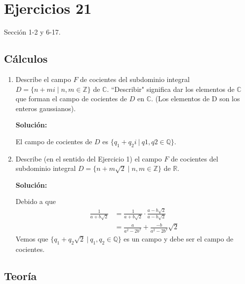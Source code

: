 \section*{Ejercicios 21}
Sección  1-2 y 6-17. 

\subsection*{Cálculos}
\begin{enumerate}
	\item Describe el campo $F$ de cocientes del subdominio integral $D = \{n + mi \mid n, m \in \mathbb{Z}\}$ de $\mathbb{C}$. ``Describir" significa dar los elementos de $\mathbb{C}$ que forman el campo de cocientes de $D$ en $\mathbb{C}$. (Los elementos de D son los enteros gaussianos).
	
	\textbf{Solución:}
	
	El campo de cocientes de $D$ es $\{q_{1} + q_{2}i \ | \ q1, q2 \in \mathbb{Q}\}$.
	
	\item Describe (en el sentido del Ejercicio 1) el campo $F$ de cocientes del subdominio integral $D = \{n + m\sqrt{2} \mid n, m \in \mathbb{Z}\}$ de $\mathbb{R}$.
	
	\textbf{Solución:}
	
	Debido a que 
	\begin{align*}
		\frac{1}{a+b\sqrt{2}} &= \frac{1}{a+b\sqrt{2}} \cdot \frac{a-b\sqrt{2}}{a-b\sqrt{2}} \\ &= \frac{a}{a^2-2b^2} + \frac{-b}{a^2-2b^2}\sqrt{2}
	\end{align*}
	Vemos que $\{q_{1} + q_{2}\sqrt{2} \ | \ q_{1} ,q_{2} \in \mathbb{Q}\}$ es un campo y debe ser el campo de cocientes.
	
\end{enumerate}

\subsection*{Teoría}
